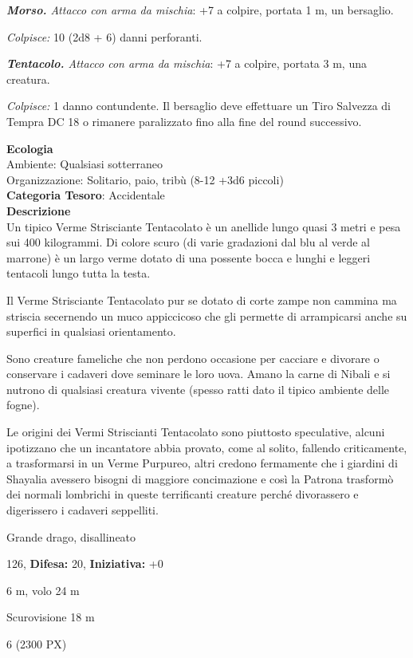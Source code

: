 \begin{multicols}{2}
{\emph{\textbf{Morso.} Attacco con arma da mischia}: +7 a colpire, portata 1 m, un bersaglio.

\emph{Colpisce:} 10 (2d8 + 6) danni perforanti.

\emph{\textbf{Tentacolo.} Attacco con arma da mischia}: +7 a colpire, portata 3 m, una creatura.

\emph{Colpisce:} 1 danno contundente. Il bersaglio deve effettuare un Tiro Salvezza di Tempra DC 18 o rimanere paralizzato fino alla fine del round successivo.

\textbf{Ecologia}\\
Ambiente: Qualsiasi sotterraneo\\
Organizzazione: Solitario, paio, tribù (8-12 +3d6 piccoli)\\
\textbf{Categoria Tesoro}: Accidentale\\
\textbf{Descrizione}\\
Un tipico Verme Strisciante Tentacolato è un anellide lungo quasi 3 metri e pesa sui 400 kilogrammi. Di colore scuro (di varie gradazioni dal blu al verde al marrone) è un largo verme dotato di una possente bocca e lunghi e leggeri tentacoli lungo tutta la testa.

Il Verme Strisciante Tentacolato pur se dotato di corte zampe non cammina ma striscia secernendo un muco appiccicoso che gli permette di arrampicarsi anche su superfici in qualsiasi orientamento.

Sono creature fameliche che non perdono occasione per cacciare e divorare o conservare i cadaveri dove seminare le loro uova. Amano la carne di Nibali e si nutrono di qualsiasi creatura vivente (spesso ratti dato il tipico ambiente delle fogne).

Le origini dei Vermi Striscianti Tentacolato sono piuttosto speculative, alcuni ipotizzano che un incantatore abbia provato, come al solito, fallendo criticamente, a trasformarsi in un Verme Purpureo, altri credono fermamente che i giardini di Shayalia avessero bisogni di maggiore concimazione e così la Patrona trasformò dei normali lombrichi in queste terrificanti creature perché divorassero e digerissero i cadaveri seppelliti.

\noindent
\begin{description}[noitemsep, topsep=0pt, parsep=0pt, partopsep=0pt, leftmargin=0cm, labelwidth=2.2cm]
	\item[\textbf{Taglia/Tipo:}] Grande drago, disallineato
	\item[\textbf{Caratt.:}] 
	\item[\textbf{Punti Ferita:}] 126,  \textbf{Difesa:} 20,  \textbf{Iniziativa:} +0
	\item[\textbf{Movimento:}] 6 m, volo 24 m
	\item[\textbf{Tiri Salvez.:}] 
	\item[\textbf{Sensi:}] Scurovisione 18 m
	\item[\textbf{Sfida:}] 6 (2300 PX)\smallskip
\end{description}

}
\end{multicols}

